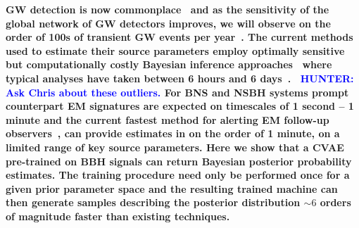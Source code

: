 \documentclass[%
showpacs,
nofootinbib,
 amsmath,amssymb,
 aps,
 twocolumn,
 prl,
 reprint,
floatfix,
]{revtex4-1}
\newcommand{\hunter}[1]{\textbf{\textcolor{blue}{HUNTER: #1}}}
\begin{document}
%
%
%
\textbf{ 
%
%
\ac{GW} detection is now
commonplace~\cite{PhysRevX.6.041015,PhysRevLett.119.161101} and as the
sensitivity of the global network of \ac{GW} detectors improves, we will
observe on the order of 100s of transient \ac{GW} events per
year~\cite{2018LRR....21....3A}. The current methods used to estimate their
source parameters employ optimally sensitive~\cite{2009CQGra..26o5017S} but
computationally costly Bayesian inference approaches~\cite{1409.7215} where
typical analyses have taken between 6 hours and 6 days~\cite{gracedb_O3}.
~\hunter{Ask Chris about these outliers.}
%
%
For \ac{BNS} and \ac{NSBH} systems prompt counterpart \ac{EM} signatures are
expected on timescales of 1 second -- 1 minute and the current fastest method
for alerting \ac{EM} follow-up observers~\cite{2016PhRvD..93b4013S}, can
provide estimates in on the order of 1 minute, on a limited range of key source
parameters. 
%
%
Here we show that a \ac{CVAE}~\cite{1904.06264,1812.04405} pre-trained on
\ac{BBH} signals can return Bayesian posterior probability estimates. The
training procedure need only be performed once for a given prior parameter
space and the resulting trained machine can then generate samples describing
the posterior distribution $\sim 6$ orders of magnitude faster than existing
techniques.}
%
\end{document}
